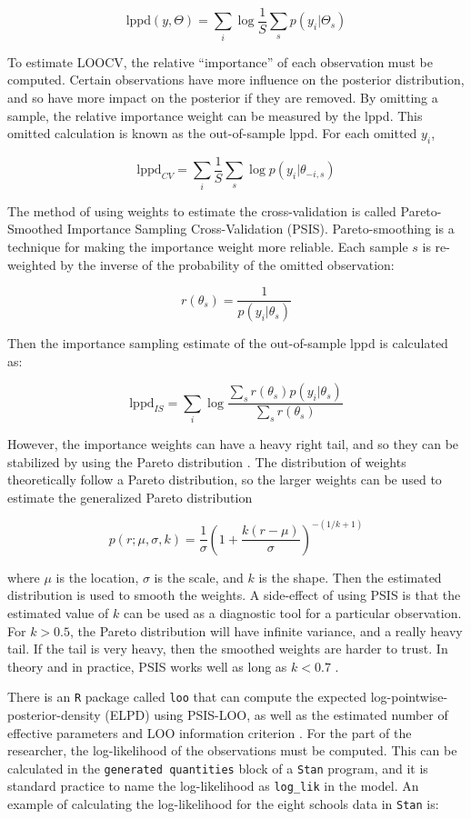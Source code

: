 \documentclass[11pt, oneside, openany]{scrbook}
\begin{document}
\begin{equation}
\mathrm{lppd}(y, \Theta) = \sum_i \log \frac{1}{S} \sum_s p(y_i | \Theta_s)
\label{eq:lppd}
\end{equation}

To estimate LOOCV, the relative ``importance'' of each observation must be computed. Certain observations have more influence on the posterior distribution, and so have more impact on the posterior if they are removed. By omitting a sample, the relative importance weight can be measured by the lppd. This omitted calculation is known as the out-of-sample lppd. For each omitted \(y_i\),

\[
\mathrm{lppd}_{CV} = \sum_i \frac{1}{S} \sum_s \log p(y_{i} | \theta_{-i,s})
\]

The method of using weights to estimate the cross-validation is called Pareto-Smoothed Importance Sampling Cross-Validation (PSIS). Pareto-smoothing is a technique for making the importance weight more reliable. Each sample \(s\) is re-weighted by the inverse of the probability of the omitted observation:

\[
r(\theta_s) = \frac{1}{p(y_i \vert \theta_s)}
\]

Then the importance sampling estimate of the out-of-sample lppd is calculated as:

\[
\mathrm{lppd}_{IS} = \sum_{i}\log \frac{\sum_{s} r(\theta_s) p(y_i \vert \theta_s)}{\sum_{s} r(\theta_s)}
\]

However, the importance weights can have a heavy right tail, and so they can be stabilized by using the Pareto distribution \citep{vehtari2015pareto}. The distribution of weights theoretically follow a Pareto distribution, so the larger weights can be used to estimate the generalized Pareto distribution

\[
p(r; \mu, \sigma, k) = \frac{1}{\sigma} \left(1 + \frac{k (r - \mu)}{\sigma}\right)^{-(1/k + 1)}
\]

where \(\mu\) is the location, \(\sigma\) is the scale, and \(k\) is the shape. Then the estimated distribution is used to smooth the weights. A side-effect of using PSIS is that the estimated value of \(k\) can be used as a diagnostic tool for a particular observation. For \(k>0.5\), the Pareto distribution will have infinite variance, and a really heavy tail. If the tail is very heavy, then the smoothed weights are harder to trust. In theory and in practice, PSIS works well as long as \(k < 0.7\) \citep{vehtari2015pareto}.

There is an \texttt{R} package called \texttt{loo} that can compute the expected log-pointwise-posterior-density (ELPD) using PSIS-LOO, as well as the estimated number of effective parameters and LOO information criterion \citep{R-loo}. For the part of the researcher, the log-likelihood of the observations must be computed. This can be calculated in the \texttt{generated\ quantities} block of a \texttt{Stan} program, and it is standard practice to name the log-likelihood as \texttt{log\_lik} in the model. An example of calculating the log-likelihood for the eight schools data in \texttt{Stan} is:
\end{document}
